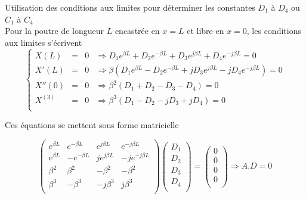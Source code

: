 \documentclass[a4paper,10pt]{article}
\begin{document}
Utilisation des conditions aux limites pour déterminer les constantes \begin{math} D_1 \end{math} à \begin{math} D_4 \end{math} ou  \begin{math} C_1 \end{math} à \begin{math} C_4 \end{math}
\\
Pour la poutre de longueur \begin{math} L \end{math} encastrée en \begin{math} x=L \end{math} et libre en \begin{math} x=0 \end{math}, les conditions aux limites s'écrivent
\begin{equation} 
	\left\{
		\begin{aligned}
			X(L) 	&=& 	0  &\Rightarrow  D_1 e^{\beta L} +  D_2 e^{-\beta L} +  D_3 e^{j\beta L} +  D_4 e^{-j\beta L} =  0 \\
			X'(L) 	&=&	0  &\Rightarrow  \beta ( D_1 e^{\beta L} -  D_2 e^{-\beta L} + j D_3 e^{j\beta L} - j D_4 e^{-j\beta L} ) =  0\\
			X''(0)	&=&	0  &\Rightarrow  \beta^2 ( D_1  +  D_2 -   D_3  -  D_4 ) =  0  \\
			X^{(3)} &=& 0  &\Rightarrow  \beta^3 ( D_1  -  D_2 -  j D_3  + j D_4 ) =  0  \\
		\end{aligned}	
	\right.
 \end{equation}

Ces équations se mettent sous forme matricielle

\begin{equation} 
	\begin{pmatrix}
   	e^{\beta L} 	& e^{-\beta L} 	& e^{j\beta L} 	& e^{-j\beta L}	\\
   	 e^{\beta L} & -e^{-\beta L}	&j e^{j\beta L}	& -je^{-j\beta L}	\\
  	 \beta^2	&\beta^2		&-\beta^2		&-\beta^2		\\
	\beta^3	&-\beta^3		&-j\beta^3		&j\beta^3		\\
	\end{pmatrix} 
	\begin{pmatrix}
   	D_1 	\\
   	D_2	\\
  	D_3	\\
	D_4	\\
	\end{pmatrix} 
= 
	\begin{pmatrix}
   	0 	\\
   	0	\\
  	0	\\
	0	\\
	\end{pmatrix} 
	\Rightarrow
	A.D=0
\end{equation}
\end{document}

